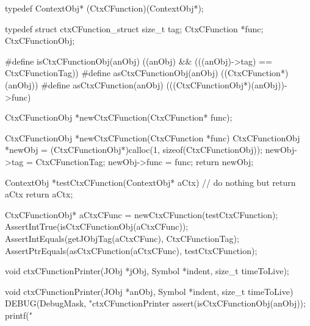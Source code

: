 \startCHeader
typedef ContextObj* (CtxCFunction)(ContextObj*);

typedef struct ctxCFunction_struct {
  size_t        tag;
  CtxCFunction *func;
} CtxCFunctionObj;

#define isCtxCFunctionObj(anObj) ((anObj) && (((anObj)->tag) == CtxCFunctionTag))
#define asCtxCFunctionObj(anObj) ((CtxCFunction*)(anObj))
#define asCtxCFunction(anObj)    (((CtxCFunctionObj*)(anObj))->func)
\stopCHeader

\startTestSuite[newCtxCFunction]

\startCHeader
CtxCFunctionObj *newCtxCFunction(CtxCFunction* func);
\stopCHeader

\startCCode
CtxCFunctionObj *newCtxCFunction(CtxCFunction *func) {
  CtxCFunctionObj *newObj =
    (CtxCFunctionObj*)calloc(1, sizeof(CtxCFunctionObj));
  newObj->tag  = CtxCFunctionTag;
  newObj->func = func;
  return newObj;
}
\stopCCode


\startCTest
  ContextObj *testCtxCFunction(ContextObj* aCtx){
    // do nothing but return aCtx
    return aCtx;
  }
  
  CtxCFunctionObj* aCtxCFunc = newCtxCFunction(testCtxCFunction);
  AssertIntTrue(isCtxCFunctionObj(aCtxCFunc));
  AssertIntEquals(getJObjTag(aCtxCFunc), CtxCFunctionTag);
  AssertPtrEquals(asCtxCFunction(aCtxCFunc), testCtxCFunction);
\stopCTest
\stopTestCase
\stopTestSuite

\startTestSuite[ctxCFunctionPrinter]

\startCHeader
void ctxCFunctionPrinter(JObj *jObj, Symbol *indent, size_t timeToLive);
\stopCHeader

\startCCode
void ctxCFunctionPrinter(JObj *anObj, Symbol *indent, size_t timeToLive) {
  DEBUG(DebugMask, "ctxCFunctionPrinter %
  assert(isCtxCFunctionObj(anObj));
  printf("%
}
\stopCCode

\skipTestCase
\stopTestSuite